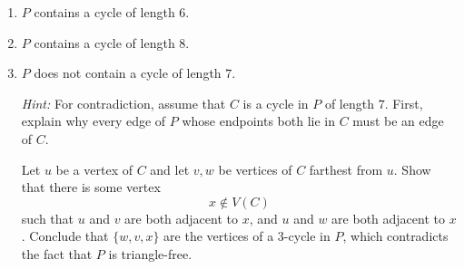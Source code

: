 \documentclass[12pt]{amsart}
\theoremstyle{conjecture}
\theoremstyle{definition}
\theoremstyle{question}
\theoremstyle{theorem}
\begin{document}
    \begin{enumerate}[label=(\alph*)]
        \item $P$ contains a cycle of length $6$.

        \item $P$ contains a cycle of length $8$.

        \item $P$ does not contain a cycle of length $7$.

        \medskip

        \noindent
        \textit{Hint:} For contradiction, assume that $C$ is a cycle in
        $P$ of length $7$. First, explain why every edge of $P$ whose
        endpoints both lie in $C$ must be an edge of $C$.

        Let $u$ be a vertex of $C$ and let $v,w$ be vertices of $C$
        farthest from $u$. Show that there is some vertex
        \[
            x \notin V(C)
        \]
        such that $u$ and $v$ are both adjacent to $x$, and $u$ and $w$
        are both adjacent to $x$. Conclude that $\{w,v,x\}$ are the
        vertices of a $3$-cycle in $P$, which contradicts the fact that
        $P$ is triangle-free.
    \end{enumerate}
\end{document}
